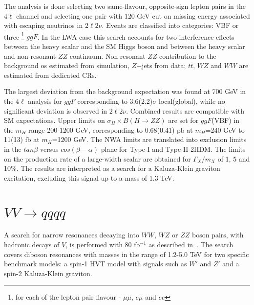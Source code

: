 \documentclass{PoS}
\begin{document}
The analysis is done selecting two same-flavour, opposite-sign lepton pairs in the $4\ell$ channel and selecting one pair with 120 GeV cut on missing energy associated with escaping neutrinos in $2\ell2\nu$.
Events are classified into categories: VBF or three
\footnote{
 for each of the lepton pair flavour - $\mu\mu$, $e\mu$ and $ee$
 }
 $ggF$.
In the LWA case this search accounts for two interference effects between the heavy scalar and the SM Higgs boson and between the heavy scalar and non-resonant $ZZ$ continuum.
Non resonant $ZZ$ contribution to the background os estimated from simulation, $Z$+jets from data; $t\bar{t}$, $WZ$ and $WW$ are estimated from dedicated CRs.

The largest deviation from the background expectation was found at 700 GeV in the $4\ell$ analysis for $ggF$ corresponding to 3.6(2.2)$\sigma$ local(global), while no significant deviation is observed in $2\ell2\nu$. Combined results are compatible with SM expectations. 
Upper limits on $\sigma_H \times B(H\rightarrow ZZ)$ are set for $ggF$(VBF) in the $m_H$ range 200-1200 GeV, corresponding to 0.68(0.41) pb at $m_H$=240 GeV to 11(13) fb at $m_H$=1200 GeV.
The NWA limits are translated into exclusion limits in the $tan \beta$ versus $cos(\beta-\alpha)$ plane for Type-I and Type-II 2HDM. 
The limits on the production rate of a large-width scalar are obtained for $\Gamma_X/m_X$ of 1, 5 and 10\%. %
The results are interpreted as a search for a Kaluza-Klein graviton excitation, excluding this signal up to a mass of 1.3 TeV. %


\vspace*{-3mm}
\section{$VV\rightarrow qqqq$}
\label{sec:VV}
\vspace*{-2mm}
A search for narrow resonances decaying into $WW$, $WZ$ or $ZZ$ boson pairs, with hadronic decays of $V$, is performed with 80 fb$^{-1}$ as described in~\cite{ATLAS-CONF-2018-016}. The search covers diboson resonances with masses in the range of 1.2-5.0 TeV for two specific benchmark models: a spin-1 HVT model with signals such as $W'$ and $Z'$ and a spin-2 Kaluza-Klein graviton.
\end{document}
